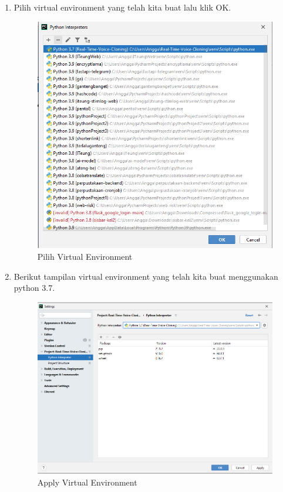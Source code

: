 \begin{enumerate}
\item Pilih virtual environment yang telah kita buat lalu klik OK.
\begin{figure}[H]
\centering
\includegraphics[scale=.4]{figures/env5}
\caption{Pilih Virtual Environment}
\label{env5}
\end{figure}

\item Berikut tampilan virtual environment yang telah kita buat menggunakan python 3.7.
\begin{figure}[H]
\centering
\includegraphics[scale=.4]{figures/env6}
\caption{Apply Virtual Environment}
\label{env6}
\end{figure}


\end{enumerate}
